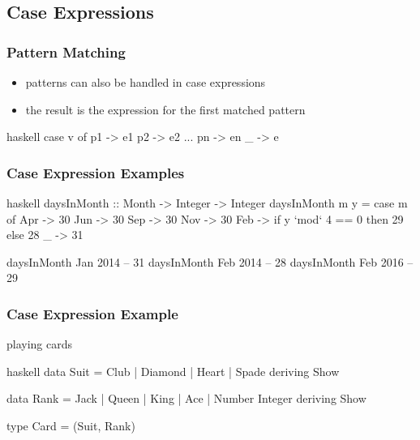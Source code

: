 \documentclass[dvipsnames]{beamer}
\theoremstyle{plain}
\begin{document}
\subsection{Case Expressions}

\begin{frame}[fragile]
  \frametitle{Pattern Matching}

  \begin{itemize}
    \item patterns can also be handled in case expressions
    \item the result is the expression for the first matched pattern
  \end{itemize}

  \begin{block}{}
    \begin{pygments}{haskell}
case v of
  p1 -> e1
  p2 -> e2
  ...
  pn -> en
  _ -> e
    \end{pygments}
  \end{block}
\end{frame}

\begin{frame}[fragile]
  \frametitle{Case Expression Examples}

  \begin{example}
    \begin{pygments}{haskell}
daysInMonth :: Month -> Integer -> Integer
daysInMonth m y =
    case m of
      Apr -> 30
      Jun -> 30
      Sep -> 30
      Nov -> 30
      Feb -> if y `mod` 4 == 0 then 29 else 28
      _ -> 31

daysInMonth Jan 2014 -- 31
daysInMonth Feb 2014 -- 28
daysInMonth Feb 2016 -- 29
    \end{pygments}
  \end{example}
\end{frame}

\begin{frame}[fragile]
  \frametitle{Case Expression Example}

  \begin{exampleblock}{playing cards}
    \begin{pygments}{haskell}
data Suit = Club | Diamond | Heart | Spade
            deriving Show

data Rank = Jack | Queen | King | Ace | Number Integer
            deriving Show

type Card = (Suit, Rank)
    \end{pygments}
  \end{exampleblock}
\end{frame}
\end{document}
